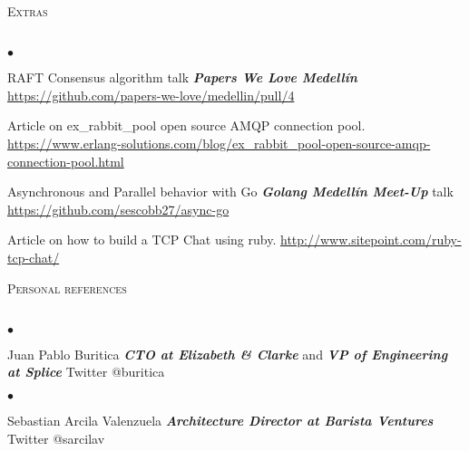 \documentclass[a4paper]{article}
\newcommand{\lineunder}{\vspace*{-8pt} \\ \hspace*{-18pt} \hrulefill \\}
\newcommand{\header}[1]{{\hspace*{-15pt}\vspace*{6pt}
  \textsc{#1}} \vspace*{-6pt} \lineunder}
\newenvironment{achievements}{\begin{list}{$\bullet$}{\topsep 0pt \itemsep
  -2pt}}{\vspace*{4pt}\end{list}}
\newcommand{\emphasys}[1]{\textbf{\emph{#1}}}
\begin{document}
  \header{Extras}
  \begin{achievements}
  \item{RAFT Consensus algorithm talk \emphasys{Papers We Love Medell\'in} \url{https://github.com/papers-we-love/medellin/pull/4}}
  \item{Article on ex\_rabbit\_pool open source AMQP connection pool. \url{https://www.erlang-solutions.com/blog/ex_rabbit_pool-open-source-amqp-connection-pool.html}}
  \item{Asynchronous and Parallel behavior with Go \emphasys{Golang Medell\'in Meet-Up} talk \url{https://github.com/sescobb27/async-go}}
  \item{Article on how to build a TCP Chat using ruby. \url{http://www.sitepoint.com/ruby-tcp-chat/}}
  \end{achievements}

  \header{Personal references}
  \begin{achievements}
  \item{Juan Pablo Buritica \emphasys{CTO at Elizabeth \& Clarke} and \emphasys{VP of Engineering at Splice} Twitter @buritica}
  \end{achievements}
  \begin{achievements}
  \item{Sebastian Arcila Valenzuela \emphasys{Architecture Director at Barista Ventures} Twitter @sarcilav}
  \end{achievements}
  
\end{document}
